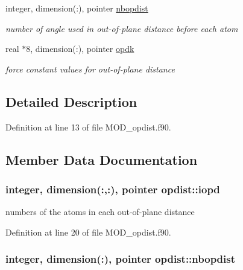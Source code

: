\begin{DoxyCompactItemize}
integer, dimension(\-:), pointer \hyperlink{classopdist_a64ebc722bc0d4adf7118c8d238a019c1}{nbopdist}
\begin{DoxyCompactList}\small\item\em number of angle used in out-\/of-\/plane distance before each atom \end{DoxyCompactList}\item 
real $\ast$8, dimension(\-:), pointer \hyperlink{classopdist_a47ec4098ffd8a4729c8667baf117b685}{opdk}
\begin{DoxyCompactList}\small\item\em force constant values for out-\/of-\/plane distance \end{DoxyCompactList}\end{DoxyCompactItemize}


\subsection{Detailed Description}


Definition at line 13 of file M\-O\-D\-\_\-opdist.\-f90.



\subsection{Member Data Documentation}
\hypertarget{classopdist_ad959dbaed24d0e42ce8db3cc0b94d622}{
\subsubsection[{iopd}]{\setlength{\rightskip}{0pt plus 5cm}integer, dimension(\-:,\-:), pointer opdist\-::iopd}}\label{classopdist_ad959dbaed24d0e42ce8db3cc0b94d622}


numbers of the atoms in each out-\/of-\/plane distance 



Definition at line 20 of file M\-O\-D\-\_\-opdist.\-f90.

\hypertarget{classopdist_a64ebc722bc0d4adf7118c8d238a019c1}{
\subsubsection[{nbopdist}]{\setlength{\rightskip}{0pt plus 5cm}integer, dimension(\-:), pointer opdist\-::nbopdist}}\label{classopdist_a64ebc722bc0d4adf7118c8d238a019c1}



